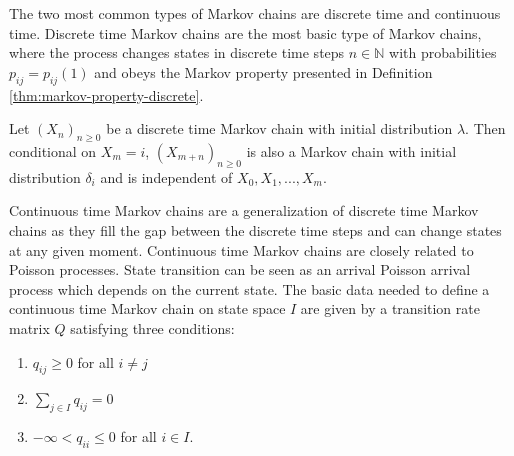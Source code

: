 
The two most common types of Markov chains are discrete time and continuous time.
Discrete time Markov chains are the most basic type of Markov chains, where the process
changes states in discrete time steps $n \in \mathbb{N}$ with probabilities $p_{ij} = p_{ij}(1)$
and obeys the Markov property presented in Definition \ref{thm:markov-property-discrete}.

\begin{defn}
\label{thm:markov-property-discrete}
Let $(X_n)_{n \ge 0}$ be a discrete time Markov chain with initial distribution $\lambda$.
Then conditional on $X_m = i$, $(X_{m + n})_{n \ge 0}$ is also a Markov chain with initial
distribution $\delta_i$ and is independent of $X_0, X_1, ..., X_m$.
\end{defn}

Continuous time Markov chains are a generalization of discrete time Markov chains as they
fill the gap between the discrete time steps and can change states at any given moment.
Continuous time Markov chains are closely related to Poisson processes. State transition can be seen as an arrival  Poisson arrival process which depends on the current state. 
%
%
The basic data needed to define a continuous time Markov chain on state space $I$ are
given by a transition rate matrix $Q$ satisfying three conditions:
\begin{enumerate}
	\item $q_{ij} \ge 0$ for all $i \ne j$
	\item $\sum_{j \in I} q_{ij} = 0$
	\item $-\infty < q_{ii} \le 0$ for all $i \in I$.
\end{enumerate}

